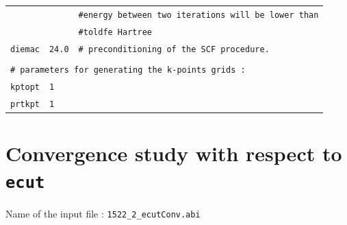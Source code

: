 \documentclass[11pt,a4paper]{article}
\begin{document}
\begin{center}
\begin{tabular}{lll}
&&\texttt{\#\space\space\space\space energy between two iterations will be lower than}\\
&&\texttt{\#\space\space\space\space toldfe Hartree}\\
\texttt{diemac} &\texttt{24.0} & \texttt{\# preconditioning of the SCF procedure.}\\
&&\\
\multicolumn{3}{l}{\texttt{\# parameters for generating the k-points grids : }}\\
\texttt{kptopt} & \texttt{1} &\\
\texttt{prtkpt} & \texttt{1} 
\end{tabular}
\end{center} 
\newpage
\section{Convergence study with respect to \texttt{ecut}}
\label{Abi2}
Name of the input file : \texttt{1522\_2\_ecutConv.abi}
\end{document}
